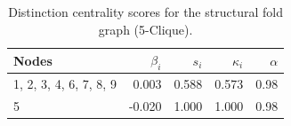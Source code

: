 \begin{table}
\centering
\caption{\label{tab:sf5}Distinction centrality scores for the structural fold graph (5-Clique).}
\centering
\begin{tabular}[t]{lrrrr}
\toprule
Nodes & $\beta_i$ & $s_i$ & $\kappa_i$ & $\alpha$\\
\midrule
1, 2, 3, 4, 6, 7, 8, 9 & 0.003 & 0.588 & 0.573 & 0.98\\
5 & -0.020 & 1.000 & 1.000 & 0.98\\
\bottomrule
\end{tabular}
\end{table}

